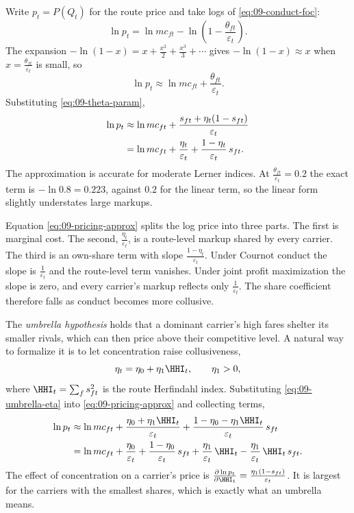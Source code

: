 Write $p_t=P(Q_t)$ for the route price and take logs of \eqref{eq:09-conduct-foc}:
\begin{equation*}
\ln p_t=\ln mc_{ft}-\ln\left(1-\frac{\theta_{ft}}{\varepsilon_t}\right).
\end{equation*}
The expansion $-\ln(1-x)=x+\frac{x^2}{2}+\frac{x^3}{3}+\cdots$ gives $-\ln(1-x)\approx x$ when
$x=\frac{\theta_{ft}}{\varepsilon_t}$ is small, so
\begin{equation*}
\ln p_t\approx\ln mc_{ft}+\frac{\theta_{ft}}{\varepsilon_t}.
\end{equation*}
Substituting \eqref{eq:09-theta-param},
\begin{align}
\ln p_t&\approx\ln mc_{ft}+\frac{s_{ft}+\eta_t(1-s_{ft})}{\varepsilon_t}\notag\\
&=\ln mc_{ft}+\frac{\eta_t}{\varepsilon_t}+\frac{1-\eta_t}{\varepsilon_t}\,s_{ft}.
\label{eq:09-pricing-approx}
\end{align}
The approximation is accurate for moderate Lerner indices. At $\frac{\theta_{ft}}{\varepsilon_t}=0.2$ the
exact term is $-\ln 0.8=0.223$, against $0.2$ for the linear term, so the linear form slightly understates
large markups.

Equation \eqref{eq:09-pricing-approx} splits the log price into three parts. The first is marginal cost.
The second, $\frac{\eta_t}{\varepsilon_t}$, is a route-level markup shared by every carrier. The third is
an own-share term with slope $\frac{1-\eta_t}{\varepsilon_t}$. Under Cournot conduct the slope is
$\frac{1}{\varepsilon_t}$ and the route-level term vanishes. Under joint profit maximization the slope is
zero, and every carrier's markup reflects only $\frac{1}{\varepsilon_t}$. The share coefficient therefore
falls as conduct becomes more collusive.

The \emph{umbrella hypothesis} holds that a dominant carrier's high fares shelter its smaller rivals,
which can then price above their competitive level. A natural way to formalize it is to let concentration
raise collusiveness,
\begin{equation}\label{eq:09-umbrella-eta}
\eta_t=\eta_0+\eta_1\HHI_t,\qquad \eta_1>0,
\end{equation}
where $\HHI_t=\sum_f s_{ft}^2$ is the route Herfindahl index. Substituting \eqref{eq:09-umbrella-eta}
into \eqref{eq:09-pricing-approx} and collecting terms,
\begin{align}
\ln p_t&\approx\ln mc_{ft}+\frac{\eta_0+\eta_1\HHI_t}{\varepsilon_t}
+\frac{1-\eta_0-\eta_1\HHI_t}{\varepsilon_t}\,s_{ft}\notag\\
&=\ln mc_{ft}+\frac{\eta_0}{\varepsilon_t}+\frac{1-\eta_0}{\varepsilon_t}\,s_{ft}
+\frac{\eta_1}{\varepsilon_t}\,\HHI_t-\frac{\eta_1}{\varepsilon_t}\,\HHI_t\,s_{ft}.
\label{eq:09-umbrella}
\end{align}
The effect of concentration on a carrier's price is
$\frac{\partial\ln p_t}{\partial\HHI_t}=\frac{\eta_1(1-s_{ft})}{\varepsilon_t}$. It is largest for the
carriers with the smallest shares, which is exactly what an umbrella means.

